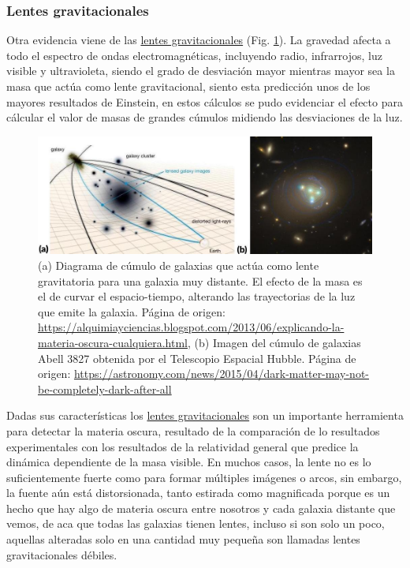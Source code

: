 \subsubsection{Lentes gravitacionales}
Otra evidencia viene de las \href{https://en.wikipedia.org/wiki/Gravitational_lens}{lentes gravitacionales} (Fig. \ref{lentes}). La gravedad afecta a todo el espectro de ondas electromagnéticas, incluyendo radio, infrarrojos, luz visible y ultravioleta, siendo el grado de desviación mayor mientras mayor sea la masa que actúa como lente gravitacional, siento esta predicción unos de los mayores resultados de Einstein, en estos cálculos se pudo evidenciar el efecto para cálcular el valor de masas de grandes cúmulos midiendo las desviaciones de la luz.

\begin{figure}
\centering
\includegraphics[width=1\textwidth]{Fisica_de_Particulas/imagenes/lentes.jpg}
\caption{(a) Diagrama de cúmulo de galaxias que actúa como lente gravitatoria para una galaxia muy distante. El efecto de la masa es el de curvar el espacio-tiempo, alterando las trayectorias de la luz que emite la galaxia. Página de origen: \url{https://alquimiayciencias.blogspot.com/2013/06/explicando-la-materia-oscura-cualquiera.html}, (b) Imagen del cúmulo de galaxias Abell 3827 obtenida por el Telescopio Espacial Hubble. Página de origen: \url{https://astronomy.com/news/2015/04/dark-matter-may-not-be-completely-dark-after-all} %
}
\label{lentes}
\end{figure}
Dadas sus características los \href{https://curiosoando.com/introduccion-a-las-lentes-gravitacionales}{lentes gravitacionales} son un importante herramienta para detectar la materia oscura, resultado de la comparación de lo resultados experimentales con los resultados de la relatividad general que predice la dinámica dependiente de la masa visible. En muchos casos, la lente no es lo suficientemente fuerte como para formar múltiples imágenes o arcos, sin embargo, la fuente aún está distorsionada, tanto estirada como magnificada porque es un hecho que hay algo de materia oscura entre nosotros y cada galaxia distante que vemos, de aca que todas las galaxias tienen lentes, incluso si son solo un poco, aquellas alteradas solo en una cantidad muy pequeña son llamadas lentes gravitacionales débiles.
